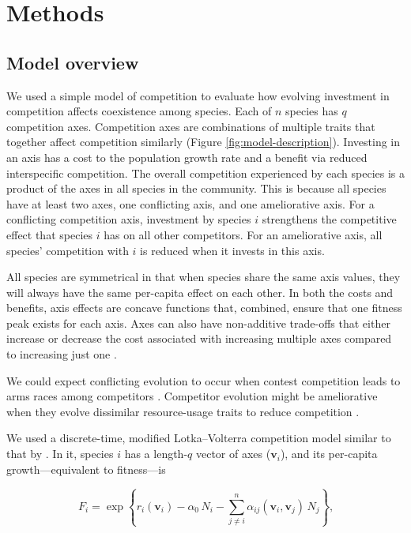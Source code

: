 
\section*{Methods}


\subsection*{Model overview}

We used a simple model of competition to evaluate how evolving investment in 
competition affects coexistence among species.
Each of $n$ species has $q$ competition axes.
Competition axes are combinations of multiple traits that together affect 
competition similarly (Figure \ref{fig:model-description}).
Investing in an axis has a cost to the population growth rate and 
a benefit via reduced interspecific competition.
The overall competition experienced by each species is a product of 
the axes in all species in the community.
This is because all species have at least two axes, 
one conflicting axis, and one ameliorative axis.
For a conflicting competition axis, investment by species $i$
strengthens the competitive effect that species $i$ has on all
other competitors.
For an ameliorative axis, all species' competition with 
$i$ is reduced when it invests in this axis.




All species are symmetrical in that when species share the same axis 
values, they will always have the same per-capita effect on each other.
In both the costs and benefits, axis effects are concave functions that,
combined, ensure that one fitness peak exists for each axis.
Axes can also have non-additive trade-offs that either increase or decrease
the cost associated with increasing multiple axes compared to increasing
just one \citep{Northfield2021}.

We could expect conflicting evolution to occur when contest competition
leads to arms races among competitors
\citep{Abrams1994}.
Competitor evolution might be ameliorative when they evolve
dissimilar resource-usage traits to reduce competition \citep{Roughgarden1976}.


We used a discrete-time, modified Lotka--Volterra competition model similar to
that by \citet{Northfield2013a}.
In it, species $i$ has a length-$q$ vector of axes ($\mathbf{v}_i$), and
its per-capita growth---equivalent to fitness---is

\begin{equation} \label{eq:fitness}
    F_{i} = \exp \left\{ r_i(\mathbf{v}_i) - 
        \alpha_{0} \, N_i - \sum_{j \ne i}^{n}{
            \alpha_{ij}(\mathbf{v}_i, \mathbf{v}_j) \, N_j}  
    \right\}\textrm{,}
\end{equation}

